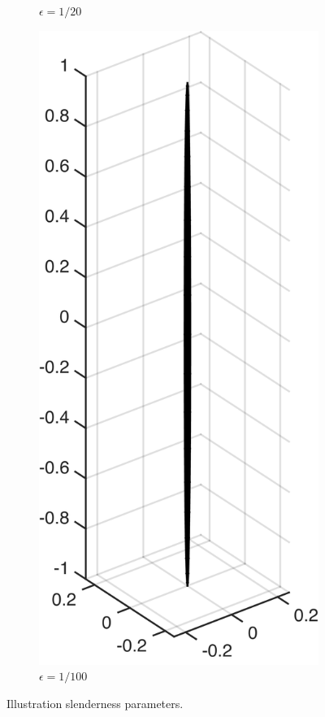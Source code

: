 \documentclass[a4paper,11pt]{kth-mag}
\begin{document}
\begin{figure}[!htbp]
\begin{subfigure}[h]{0.24\textwidth}
    \caption{$\epsilon=1/20$}\label{fig:slenderness_1_20}
  \end{subfigure}
  \begin{subfigure}[h]{0.24\textwidth}
    \centering
    \includegraphics[width=\textwidth]{img/slender/1_100.png}
    \caption{$\epsilon=1/100$}\label{fig:slenderness_1_100}
  \end{subfigure}
  \caption{Illustration slenderness parameters.}
  \label{fig:slenderness}
\end{figure}
\end{document}
